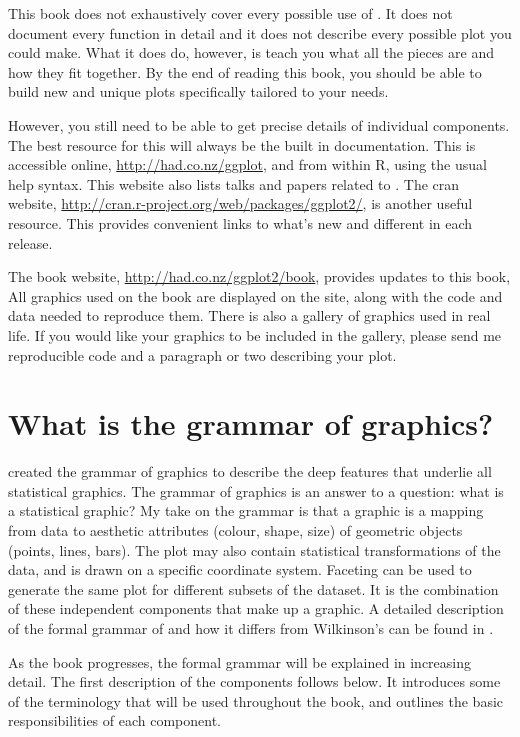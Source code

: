 This book does not exhaustively cover every possible use of \ggplot.  It does not document every function in detail and it does not describe every possible plot you could make.  What it does do, however, is teach you what all the pieces are and how they fit together.  By the end of reading this book, you should be able to build new and unique plots specifically tailored to your needs.  

However, you still need to be able to get precise details of individual components.  The best resource for this will always be the built in documentation.  This is accessible online, \url{http://had.co.nz/ggplot}, and from within R, using the usual help syntax. This website also lists talks and papers related to \ggplot.  The {\sc cran} website, \url{http://cran.r-project.org/web/packages/ggplot2/}, is another useful resource.  This provides convenient links to what's new and different in each release.

The book website, \url{http://had.co.nz/ggplot2/book}, provides updates to this book,   All graphics used on the book are displayed on the site, along with the code and data needed to reproduce them.  There is also a gallery of \ggplot graphics used in real life.  If you would like your graphics to be included in the gallery, please send me reproducible code and a paragraph or two describing your plot.


\section{What is the grammar of graphics?}

\citet{wilkinson:2006} created the grammar of graphics to describe the deep features that underlie all statistical graphics.  The grammar of graphics is an answer to a question: what is a statistical graphic?  My take on the grammar is that a graphic is a mapping from data to  aesthetic attributes (colour, shape, size) of geometric objects (points, lines, bars).  The plot may also contain statistical transformations of the data, and is drawn on a specific  coordinate system.  Faceting can be used to generate the same plot for different subsets of the dataset.  It is the combination of these independent components that make up a graphic.  A detailed description of the formal grammar of \ggplot and how it differs from Wilkinson's can be found in \citet{wickham:2007d}.

As the book progresses, the formal grammar will be explained in increasing detail.  The first description of the components follows below.  It introduces some of the terminology that will be used throughout the book, and outlines the basic responsibilities of each component.  

